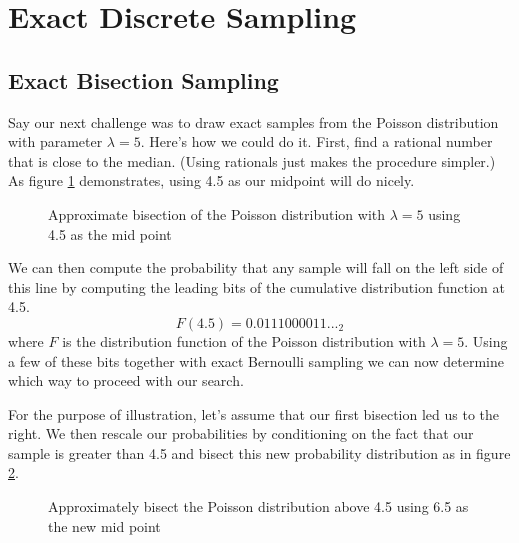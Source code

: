 \section{Exact Discrete Sampling}

\subsection{Exact Bisection Sampling}

Say our next challenge was to draw exact samples from the Poisson distribution with parameter $\lambda = 5$. Here's how we could do it. First, find a rational number that is close to the median. (Using rationals just makes the procedure simpler.) As figure \ref{fig:bisection_0} demonstrates, using 4.5 as our midpoint will do nicely.


\begin{figure}[h]
    \centering
    \caption{Approximate bisection of the Poisson distribution with $\lambda = 5$ using 4.5 as the mid point}
    \label{fig:bisection_0}
\end{figure}

We can then compute the probability that any sample will fall on the left side of this line by computing the leading bits of the cumulative distribution function at 4.5.
$$F(4.5) = 0.0111000011..._2$$
where $F$ is the distribution function of the Poisson distribution with $\lambda = 5$. Using a few of these bits together with exact Bernoulli sampling we can now determine which way to proceed with our search.

For the purpose of illustration, let's assume that our first bisection led us to the right. We then rescale our probabilities by conditioning on the fact that our sample is greater than 4.5 and bisect this new probability distribution as in figure \ref{fig:bisection_1}.

\begin{figure}[h]
    \centering
    \caption{Approximately bisect the Poisson distribution above 4.5 using 6.5 as the new mid point}
    \label{fig:bisection_1}
\end{figure}

